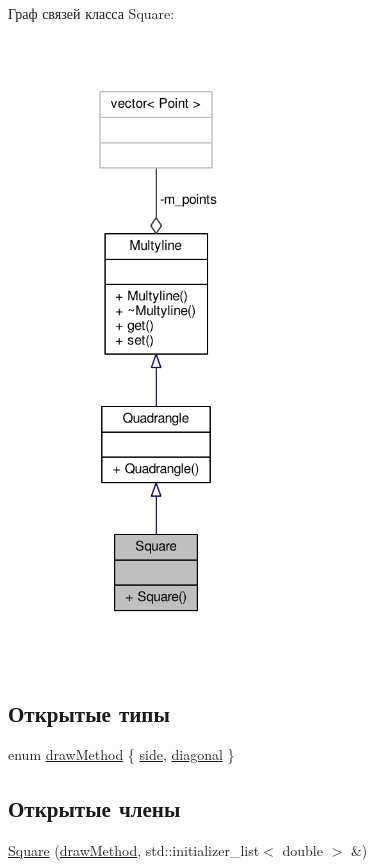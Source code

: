 Граф связей класса Square\-:
\nopagebreak
\begin{figure}[H]
\begin{center}
\leavevmode
\includegraphics[width=167pt]{class_square__coll__graph}
\end{center}
\end{figure}
\subsection*{Открытые типы}
\begin{DoxyCompactItemize}
\item 
enum \hyperlink{class_square_afb936005821ce22a9ecfbd2b3a0cfb13}{draw\-Method} \{ \hyperlink{class_square_afb936005821ce22a9ecfbd2b3a0cfb13aaf7215e74b713a4de0eeda3912b2eb82}{side}, 
\hyperlink{class_square_afb936005821ce22a9ecfbd2b3a0cfb13a52ec280a7edeecdef1ebc0439b83e5ac}{diagonal}
 \}
\end{DoxyCompactItemize}
\subsection*{Открытые члены}
\begin{DoxyCompactItemize}
\item 
\hyperlink{class_square_adf29bfeb59b78ed77afef908a3bc2745}{Square} (\hyperlink{class_multyline_ad75d7bb224267d0d7b4c40fd72a1d920}{draw\-Method}, std\-::initializer\-\_\-list$<$ double $>$ \&)
\end{DoxyCompactItemize}


